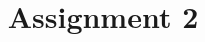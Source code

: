 \documentclass{article}
\title{\LARGE \bf
	Assignment 2
}
\begin{document}
	\maketitle
	\cite{aleem2015comparative}
	\cite{chang2015artificial}
	\cite{giusti2016machine}
	\cite{jain2016beyond}
	\cite{levine2016learning}	
	
	
\end{document}
